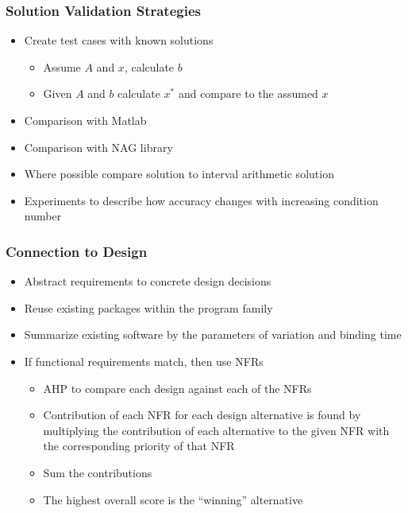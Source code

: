 \documentclass[t,12pt,numbers,fleqn]{beamer}
\begin{document}
\begin{frame}

\frametitle{Solution Validation Strategies}

\begin{itemize}
\item Create test cases with known solutions
\begin{itemize}
\item Assume $A$ and $x$, calculate $b$
\item Given $A$ and $b$ calculate $x^*$ and compare to the assumed $x$
\end{itemize}
\item Comparison with Matlab
\item Comparison with NAG library
\item Where possible compare solution to interval arithmetic solution
\item Experiments to describe how accuracy changes with increasing condition number
\end{itemize}

\end{frame}


\begin{frame}

\frametitle{Connection to Design}

\begin{itemize}

\item Abstract requirements to concrete design decisions
\item Reuse existing packages within the program family
\item Summarize existing software by the parameters of variation and binding time
\item If functional requirements match, then use NFRs
\begin{itemize}
\item AHP to compare each design against each of the NFRs %
\item Contribution of each NFR for each design alternative is found by multiplying the contribution of
each alternative to the given NFR with the corresponding priority of that NFR
\item Sum the contributions
\item The highest overall score is the ``winning'' alternative
\end{itemize}

\end{itemize}

\end{frame}
\end{document}
